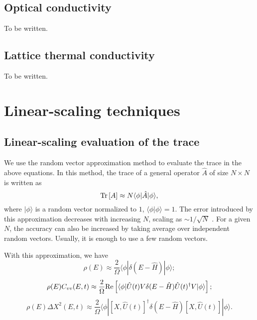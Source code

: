\documentclass[12pt,a4paper]{report}
\begin{document}
\subsection{Optical conductivity}

To be written.

\subsection{Lattice thermal conductivity}

To be written.

\section{Linear-scaling techniques\label{section:numerical}}

\subsection{Linear-scaling evaluation of the trace}

We use the random vector approximation method \cite{weisse2006rmp} to evaluate the trace in the above equations. In this method, the trace of a general operator $\hat{A}$ of size $N\times N$ is written as
\begin{equation}
 \textmd{Tr}\left[ A \right] \approx N \langle \phi | \hat{A} |\phi \rangle,
\end{equation}
where $|\phi\rangle$ is a random vector normalized to $1$, $\langle \phi | \phi \rangle = 1$. The error introduced by this approximation decreases with increasing $N$, scaling as $\sim 1/\sqrt{N}$ \cite{weisse2006rmp}. For a given $N$, the accuracy can also be increased by taking average over independent random vectors. Usually, it is enough to use a few random vectors.

With this approximation, we have
\begin{equation}
\label{equation:trace_DOS}
 \rho(E) \approx \frac{2}{\Omega} \langle \phi | \delta(E - \hat{H}) |\phi \rangle;
\end{equation}
\begin{equation}
\label{equation:trace_VAC}
 \rho (E) C_{vv}(E, t) \approx
 \frac{2}{\Omega} \textmd{Re}
 \left[ \langle\phi|\hat{U}(t)V \delta(E - \hat{H}) \hat{U}(t)^{\dagger}V|\phi \rangle \right];
\end{equation}
\begin{equation}
\label{equation:trace_MSD}
 \rho (E) \Delta X^2(E, t) \approx
 \frac{2}{\Omega}
 \langle\phi|[X, \hat{U}(t)]^{\dagger} \delta(E - \hat{H})[X, \hat{U}(t)]|\phi \rangle.
\end{equation}
\end{document}
